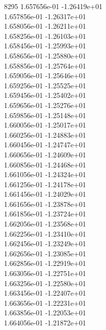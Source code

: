 8295	1.657656e-01	-1.26419e+01	\\ 	1.657856e-01	-1.26317e+01	\\ 	1.658056e-01	-1.26211e+01	\\ 	1.658256e-01	-1.26103e+01	\\ 	1.658456e-01	-1.25993e+01	\\ 	1.658656e-01	-1.25880e+01	\\ 	1.658856e-01	-1.25764e+01	\\ 	1.659056e-01	-1.25646e+01	\\ 	1.659256e-01	-1.25525e+01	\\ 	1.659456e-01	-1.25402e+01	\\ 	1.659656e-01	-1.25276e+01	\\ 	1.659856e-01	-1.25148e+01	\\ 	1.660056e-01	-1.25017e+01	\\ 	1.660256e-01	-1.24883e+01	\\ 	1.660456e-01	-1.24747e+01	\\ 	1.660656e-01	-1.24609e+01	\\ 	1.660856e-01	-1.24468e+01	\\ 	1.661056e-01	-1.24324e+01	\\ 	1.661256e-01	-1.24178e+01	\\ 	1.661456e-01	-1.24029e+01	\\ 	1.661656e-01	-1.23878e+01	\\ 	1.661856e-01	-1.23724e+01	\\ 	1.662056e-01	-1.23568e+01	\\ 	1.662256e-01	-1.23410e+01	\\ 	1.662456e-01	-1.23249e+01	\\ 	1.662656e-01	-1.23085e+01	\\ 	1.662856e-01	-1.22919e+01	\\ 	1.663056e-01	-1.22751e+01	\\ 	1.663256e-01	-1.22580e+01	\\ 	1.663456e-01	-1.22407e+01	\\ 	1.663656e-01	-1.22231e+01	\\ 	1.663856e-01	-1.22053e+01	\\ 	1.664056e-01	-1.21872e+01	\\ \hline
